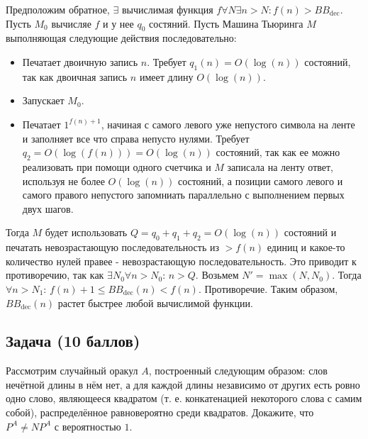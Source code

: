 \begin{solution}

    Предположим обратное, $\exists \text{ вычислимая функция } f \forall N \exists n > N: f(n) > BB_{\text{dec}}$.
    Пусть $M_0$ вычисляе $f$ и у нее $q_0$ состяний.
    Пусть Машина Тьюринга $M$ выполняющая следующие действия последовательно:
    \begin{itemize}
        \item Печатает двоичную запись $n$. Требует $q_1(n) = O(\log(n))$ состояний, так как двоичная запись $n$
              имеет длину $O(\log(n))$.
        \item Запускает $M_0$.
        \item Печатает $1^{f(n)+1}$, начиная с самого левого уже непустого символа на ленте и заполняет все что справа непусто нулями.
              Требует $q_2 = O(\log(f(n))) = O(\log(n))$ состояний, так как ее можно реализовать
              при помощи одного счетчика и $M$ записала на ленту ответ, используя не более $O(\log(n))$ состояний, а позиции самого левого
              и самого правого непустого запомниать параллельно с выполнением первых двух шагов.
    \end{itemize}
    Тогда $M$ будет использовать $Q = q_0 + q_1 + q_2 = O(\log(n))$ состояний и печатать невозрастающую последовательность из
    $> f(n)$ единиц и какое-то количество нулей правее - невозрастающую последовательность. Это приводит к противоречию, так как $\exists N_0 \forall n > N_0: \, n > Q$. Возьмем $N' = \max(N, N_0)$.
    Тогда $\forall n > N_1: \, f(n) + 1 \leq BB_{\text{dec}}(n) < f(n)$. Противоречие. Таким образом, $BB_{\text{dec}}(n)$
    растет быстрее любой вычислимой функции.
\end{solution}

\subsection{Задача \textbf{(10 баллов)}}

Рассмотрим случайный оракул $A$, построенный следующим образом: слов нечётной длины в нём нет,
а для каждой длины независимо от других есть ровно одно слово, являющееся квадратом (т. е. конкатенацией некоторого слова
с самим собой), распределённое равновероятно среди квадратов. Докажите, что $P^A \neq NP^A \text{ с вероятностью } 1$.

